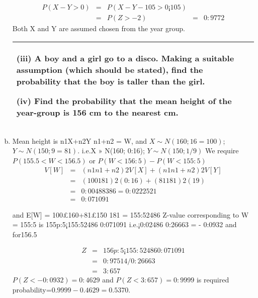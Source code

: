 \documentclass[a4paper,12pt]{article}
\begin{document}
\begin{enumerate}[(a)]
\begin{eqnarray*}
P(X - Y > 0) &=& P(X - Y - 10
5 > 0¡10
5 ) \\ &=& P(Z > - 2) &=& 0:9772 
\end{eqnarray*}
Both X and Y are assumed
chosen from the year group.


   \begin{table}[ht!]
  \centering
  \begin{tabular}{|p{15cm}|}
  \hline
(iii) A boy and a girl go to a disco.  Making a suitable assumption (which should be stated), find the probability that the boy is taller than the girl.
 
(iv) Find the probability that the mean height of the year-group is 156 cm to the nearest cm. \\    \hline
   \end{tabular}
 \end{table}
\item  Mean height is n1X+n2Y
n1+n2
= W, and $X \sim N(160; 16=100)$; $Y \sim N(150; 9=81)$. i.e.X »
N(160; 0:16); 
$Y \sim N(150; 1/9)$ We require $P(155.5 < W < 156.5)$ or $P(W < 156:5) - P(W < 155:5)$
\begin{eqnarray*}
V [W] &=& ( n1
n1+n2
)2V [X] + ( n1
n1+n2
)2V [Y ] \\ &=& ( 100
181 )2(0:16) + ( 81
181 )2( 1
9 ) \\ &=& 0:00488386 =
0:0222521 \\
&=&  0:071091
\end{eqnarray*}

and E[W] = 100£160+81£150
181 = 155:52486
Z-value corresponding to W = 155:5 is 155p:5¡155:52486
0:071091
i.e.¡0:02486
0:26663 = - 0:0932 and for156.5

\begin{eqnarray*}
Z &=& 156p:5¡155:52486
0:071091 \\ 
&=& 0:97514 /  0:26663 \\ 
&=& 3:657
\end{eqnarray*}
$P(Z < - 0:0932) = 0:4629$ and $P(Z < 3:657) = 0:9999$ is required probability=$0.9999-
0.4629=0.5370$.

\end{enumerate}
\end{document}
